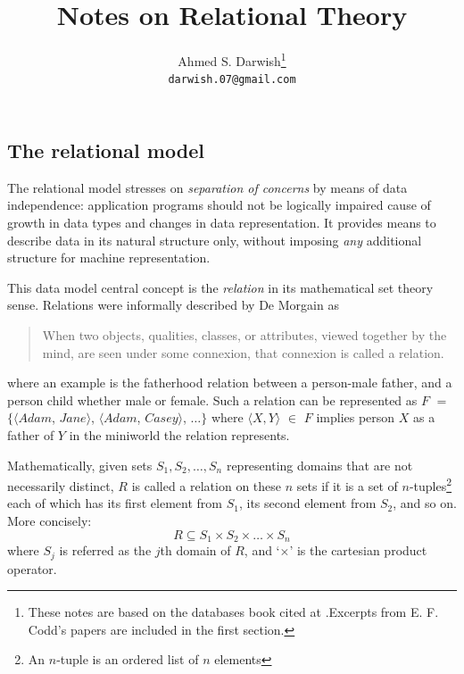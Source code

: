 \documentclass [a4paper, 12pt, twocolumn]{article}
\newcommand{\m}    {\mathit}            %
\newcommand{\<}    {\langle}            %
\renewcommand{\>}  {\rangle}            %
\begin{document}
\title{Notes on Relational Theory}

\author{Ahmed S. Darwish\footnote{These notes are based on the databases book
cited at \cite{elmasri}.Excerpts from E. F. Codd's papers are included in the
first section.}\\
\texttt{darwish.07@gmail.com}}

\maketitle

\subsection{The relational model}

The relational model stresses on \emph{separation of concerns} by means
of data independence: application programs should not be logically impaired
cause of growth in data types and changes in data representation. It provides
means to describe data in its natural structure only, without imposing
\emph{any} additional structure for machine representation.\cite{codd-v1}

This data model central concept is the \emph{relation} in its mathematical
set theory sense. Relations were informally described by De Morgain as
\begin{quote}
When two objects, qualities, classes, or attributes, viewed together by the
mind, are seen under some connexion, that connexion is called a relation.
\end{quote}
where an example is the fatherhood relation between a person-male father, and
a person child whether male or female. Such a relation can be represented as
$\m{F}$ $=$ $\{\<\m{Adam}$, $\m{Jane}\>$, $\<\m{Adam}$, $\m{Casey}\>$,
$\ldots \}$ where $\<X, Y\>$ $\in$ $\m{F}$ implies person $X$ as a father of
$Y$ in the miniworld the relation represents.

Mathematically, given sets $S_1, S_2, \ldots, S_n$ representing domains that
are not necessarily distinct, $R$ is called a relation on these $n$ sets if
it is a set of $n$-tuples\footnote{An $n$-tuple is an ordered list of $n$
elements} each of which has its first element from $S_1$, its second element
from $S_2$, and so on. More concisely:
\begin{equation*}
  R \subseteq S_1 \times S_2 \times \ldots \times S_n
\end{equation*}
where $S_j$ is referred as the $j$th domain of $R$, and `$\times$' is the
cartesian product operator.
\end{document}
